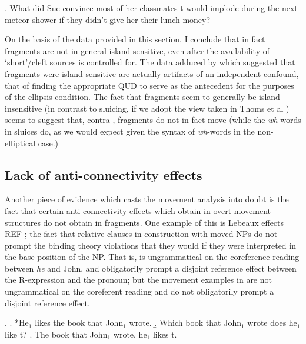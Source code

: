 \documentclass[11pt,letterpaper]{article}
\begin{document}
\ex. 	What did Sue convince most of her classmates t would implode during the next meteor shower if they didn't give her their lunch money?

On the basis of the data provided in this section, I conclude that in fact fragments are not in general island-sensitive, even after the availability of `short'/cleft sources is controlled for. The data adduced by \cite{Me04} which suggested that fragments were island-sensitive are actually artifacts of an independent confound, that of finding the appropriate QUD to serve as the antecedent for the purposes of the ellipsis condition. The fact that fragments seem to generally be island-insensitive (in contrast to sluicing, if we adopt the view taken in Thoms et al %
) seems to suggest that, contra \cite{Me04}, fragments do not in fact move (while the {\it wh}-words in sluices do, as we would expect given the syntax of {\it wh}-words in the non-elliptical case.)

\subsection{Lack of anti-connectivity effects}

Another piece of evidence which casts the movement analysis into doubt is the fact that certain anti-connectivity effects which obtain in overt movement structures do not obtain in fragments. One example of this is Lebeaux effects REF %
; the fact that relative clauses in construction with moved NPs do not prompt the binding theory violations that they would if they were interpreted in the base position of the NP. That is, \Next[a] is ungrammatical on the coreference reading between {\it he} and John, and obligatorily prompt a disjoint reference effect between the R-expression and the pronoun; but the movement examples in \Next[b, c] are not ungrammatical on the coreferent reading and do not obligatorily prompt a disjoint reference effect.

\ex. 	\a. *He$_1$ likes the book that John$_1$ wrote.
	\b. Which book that John$_1$ wrote does he$_1$ like t?
	\b. The book that John$_1$ wrote, he$_1$ likes t.
	
\end{document}
